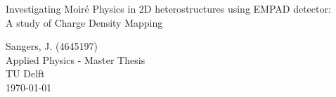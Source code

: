 \begin{titlepage} %
	
	
	\colorbox{pastelblue}{
		\parbox[t]{0.93\textwidth}{ %
			\parbox[t]{0.91\textwidth}{ %
				\raggedleft %
				\fontsize{50pt}{50pt}\selectfont %
				\vspace{0.7cm} %
			    Investigating Moiré Physics in 2D heterostructures using EMPAD detector:\\
				
				
				\fontsize{15pt}{30pt}\selectfont
                A study of Charge Density Mapping
				\vspace{0.7cm} %
			}
		}
	}
	
	\vfill %
	
	\colorbox{pastelblue}{
	\parbox[t]{0.4\textwidth}{ %
		\large %
		{\Large  Sangers, J. (4645197)}\\[4pt] %
		Applied Physics - Master Thesis\\
		TU Delft\\
		\today \\[4pt]
	   }
        }
	
\end{titlepage}
